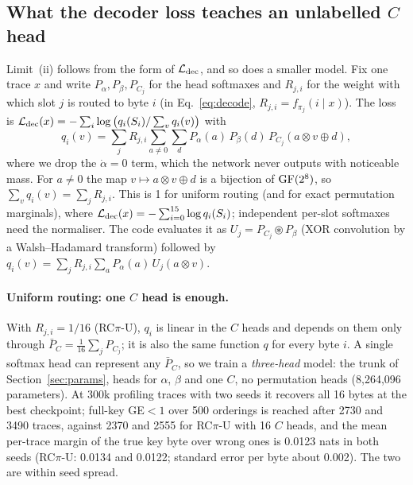 \subsection{What the decoder loss teaches an unlabelled $C$ head}
\label{sec:ladder-theory}
Limit~(ii) follows from the form of $\mathcal{L}_{\mathrm{dec}}$, and so does a smaller model. Fix one trace $x$ and write
$P_\alpha,P_\beta,P_{C_j}$ for the head softmaxes and $R_{j,i}$ for the weight with which slot $j$ is
routed to byte $i$ (in Eq.~\eqref{eq:decode}, $R_{j,i}=f_{\pi_j}(i\mid x)$). The loss is
$\mathcal{L}_{\mathrm{dec}}(x) = -\sum_{i}\log\big(q_i(S_i)/\sum_v q_i(v)\big)$ with
\begin{equation}
  q_i(v) = \sum_j R_{j,i}\sum_{a\neq0}\sum_{d} P_\alpha(a)\,P_\beta(d)\,P_{C_j}(a\otimes v\oplus d),
  \label{eq:ldec}
\end{equation}
where we drop the $\dot\alpha=0$ term, which the network never outputs with noticeable mass. For $a\neq0$
the map $v\mapsto a\otimes v\oplus d$ is a bijection of $\mathrm{GF}(2^8)$, so $\sum_v q_i(v)=\sum_j R_{j,i}$. This is
1 for uniform routing (and for exact permutation marginals), where $\mathcal{L}_{\mathrm{dec}}(x)=-\sum_{i=0}^{15}\log q_i(S_i)$;
independent per-slot softmaxes need the normaliser.
The code evaluates it as $U_j=P_{C_j}\circledast P_\beta$ (XOR convolution by a Walsh--Hadamard transform)
followed by $q_i(v)=\sum_j R_{j,i}\sum_a P_\alpha(a)\,U_j(a\otimes v)$.

\paragraph{Uniform routing: one $C$ head is enough.}
With $R_{j,i}=1/16$ (RC$\pi$-U), $q_i$ is linear in the $C$ heads and depends on them only through
$\bar P_C=\frac1{16}\sum_j P_{C_j}$; it is also the same function $q$ for every byte $i$. A single softmax
head can represent any $\bar P_C$, so we train a \emph{three-head} model: the trunk of
Section~\ref{sec:params}, heads for $\alpha$, $\beta$ and one $C$, no permutation heads (8,264,096
parameters). At 300k profiling traces with two seeds it recovers all 16 bytes at the best checkpoint; full-key
GE$<1$ over 500 orderings is reached after 2730 and 3490 traces, against 2370 and 2555 for RC$\pi$-U with 16
$C$ heads, and the mean per-trace margin of the true key byte over wrong ones is 0.0123 nats in both seeds
(RC$\pi$-U: 0.0134 and 0.0122; standard error per byte about 0.002). The two are within seed spread.

